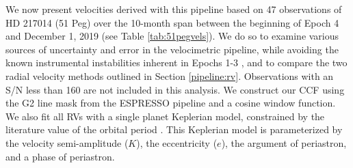 We now present velocities derived with this pipeline based on 47 observations of HD 217014 (51 Peg) over the 10-month span between the beginning of Epoch 4 and December 1, 2019 (see Table \ref{tab:51pegvels}). We do so to examine various sources of uncertainty and error in the velocimetric pipeline, while avoiding the known instrumental instabilities inherent in Epochs 1-3 \citep[see][and A. Szymkowiak et al., in prep, for details]{blackman_performance_2020}, and to compare the two radial velocity methods outlined in Section \ref{pipeline:rv}. Observations with an S/N less than 160 are not included in this analysis. We construct our CCF using the G2 line mask from the ESPRESSO pipeline \citep{freudling_automated_2013, modigliani_espresso_2019} and a cosine window function. We also fit all RVs with a single planet Keplerian model, constrained by the literature value of the orbital period \citep[4.2308 days,][]{wang_eccentricity_2011}. This Keplerian model is parameterized by the velocity semi-amplitude ($K$), the eccentricity ($e$), the argument of periastron, and a phase of periastron.

